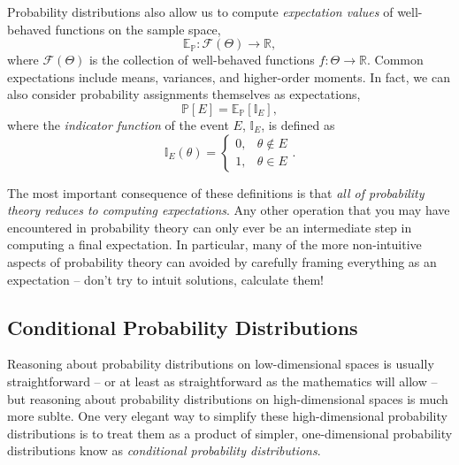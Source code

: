 \documentclass[11pt, oneside]{article}
\newcommand{\PP}{ \mathbb{P} }
\newcommand{\EE}{ \mathbb{E} }
\begin{document}
Probability distributions also allow us to compute \emph{expectation values} 
of well-behaved functions on the sample space,
%
\begin{equation*}
\EE_{\PP} : \mathcal{F} \! \left( \Theta \right) \rightarrow \mathbb{R},
\end{equation*}
%
where $\mathcal{F} \! \left( \Theta \right)$ is the collection of well-behaved 
functions $f : \Theta \rightarrow \mathbb{R}$.  Common expectations 
include means, variances, and higher-order moments.  In fact, we
can also consider probability assignments themselves as expectations,
%
\begin{equation*}
\PP \! \left[ E \right] = \EE_{\PP} \! \left[ \mathbb{I}_{E} \right],
\end{equation*}
%
where the \emph{indicator function} of the event $E$, $\mathbb{I}_{E}$,
is defined as
%
\begin{equation*}
\mathbb{I}_{E} \! \left( \theta \right)
= 
\left\{
\begin{array}{rr}
0, & \theta \notin E \\
1, & \theta \in E
\end{array}
\right. .
\end{equation*}

The most important consequence of these definitions is that \emph{all of 
probability theory reduces to computing expectations}.  Any other operation 
that you may have encountered in probability theory can only ever be an
intermediate step in computing a final expectation.  In particular, many of 
the more non-intuitive aspects of probability theory can avoided by carefully
framing everything as an expectation -- don't try to intuit solutions, calculate 
them!

\subsection{Conditional Probability Distributions}

Reasoning about probability distributions on low-dimensional spaces
is usually straightforward -- or at least as straightforward as the
mathematics will allow -- but reasoning about probability distributions
on high-dimensional spaces is much more sublte.  One
very elegant way to simplify these high-dimensional probability
distributions is to treat them as a product of simpler, one-dimensional
probability distributions know as \emph{conditional probability
distributions}.
\end{document}

